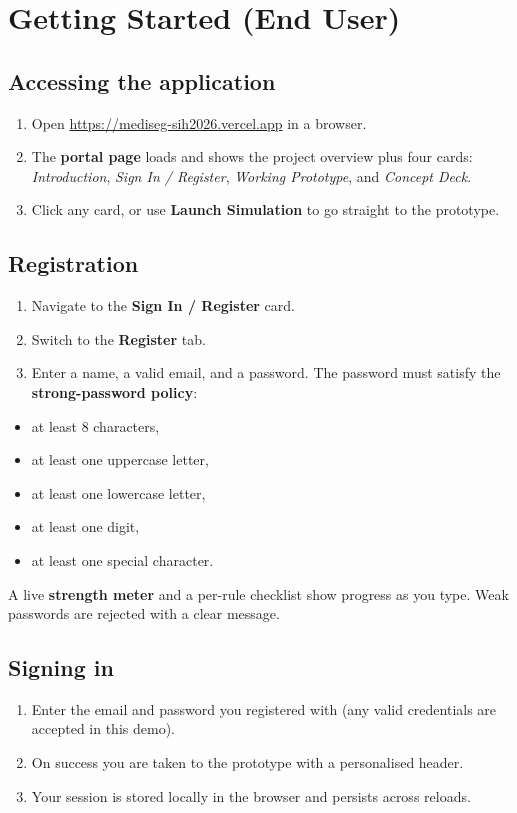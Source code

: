 \documentclass[11pt, a4paper]{article}
\begin{document}
\section{Getting Started (End User)}
\label{sec:getstarted}

\subsection{Accessing the application}
\begin{enumerate}[leftmargin=1.6em, itemsep=2pt]
  \item Open \url{https://mediseg-sih2026.vercel.app} in a browser.
  \item The \textbf{portal page} loads and shows the project overview plus four
        cards: \textit{Introduction}, \textit{Sign In / Register},
        \textit{Working Prototype}, and \textit{Concept Deck}.
  \item Click any card, or use \textbf{Launch Simulation} to go straight to the
        prototype.
\end{enumerate}

\subsection{Registration}
\begin{enumerate}[leftmargin=1.6em, itemsep=2pt]
  \item Navigate to the \textbf{Sign In / Register} card.
  \item Switch to the \textbf{Register} tab.
  \item Enter a name, a valid email, and a password. The password must satisfy
        the \textbf{strong-password policy}:
\end{enumerate}
\begin{itemize}[leftmargin=1.6em, itemsep=2pt]
  \item at least 8 characters,
  \item at least one uppercase letter,
  \item at least one lowercase letter,
  \item at least one digit,
  \item at least one special character.
\end{itemize}
A live \textbf{strength meter} and a per-rule checklist show progress as you
type. Weak passwords are rejected with a clear message.

\subsection{Signing in}
\begin{enumerate}[leftmargin=1.6em, itemsep=2pt]
  \item Enter the email and password you registered with (any valid credentials
        are accepted in this demo).
  \item On success you are taken to the prototype with a personalised header.
  \item Your session is stored locally in the browser and persists across
        reloads.
\end{enumerate}
\end{document}
